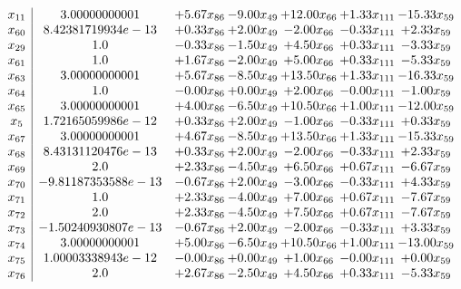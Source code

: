 \documentclass[8pt]{article}
\begin{document}
\[\begin{array}{c| c c@{\hskip 2pt} c@{\hskip 2pt} c@{\hskip 2pt} c@{\hskip 2pt} c@{\hskip 2pt} }
 x_{11}   &  3.00000000001 & +  5.67 x_{86} & -9.00 x_{49} & + 12.00 x_{66} & +  1.33 x_{111} & -15.33 x_{59}\\
 x_{60}   &  8.42381719934e-13 & +  0.33 x_{86} & +  2.00 x_{49} & -2.00 x_{66} & -0.33 x_{111} & +  2.33 x_{59}\\
 x_{29}   &  1.0 & -0.33 x_{86} & -1.50 x_{49} & +  4.50 x_{66} & +  0.33 x_{111} & -3.33 x_{59}\\
 x_{61}   &  1.0 & +  1.67 x_{86} & -2.00 x_{49} & +  5.00 x_{66} & +  0.33 x_{111} & -5.33 x_{59}\\
 x_{63}   &  3.00000000001 & +  5.67 x_{86} & -8.50 x_{49} & + 13.50 x_{66} & +  1.33 x_{111} & -16.33 x_{59}\\
 x_{64}   &  1.0 & -0.00 x_{86} & +  0.00 x_{49} & +  2.00 x_{66} & -0.00 x_{111} & -1.00 x_{59}\\
 x_{65}   &  3.00000000001 & +  4.00 x_{86} & -6.50 x_{49} & + 10.50 x_{66} & +  1.00 x_{111} & -12.00 x_{59}\\
 x_{5}   &  1.72165059986e-12 & +  0.33 x_{86} & +  2.00 x_{49} & -1.00 x_{66} & -0.33 x_{111} & +  0.33 x_{59}\\
 x_{67}   &  3.00000000001 & +  4.67 x_{86} & -8.50 x_{49} & + 13.50 x_{66} & +  1.33 x_{111} & -15.33 x_{59}\\
 x_{68}   &  8.43131120476e-13 & +  0.33 x_{86} & +  2.00 x_{49} & -2.00 x_{66} & -0.33 x_{111} & +  2.33 x_{59}\\
 x_{69}   &  2.0 & +  2.33 x_{86} & -4.50 x_{49} & +  6.50 x_{66} & +  0.67 x_{111} & -6.67 x_{59}\\
 x_{70}   &  -9.81187353588e-13 & -0.67 x_{86} & +  2.00 x_{49} & -3.00 x_{66} & -0.33 x_{111} & +  4.33 x_{59}\\
 x_{71}   &  1.0 & +  2.33 x_{86} & -4.00 x_{49} & +  7.00 x_{66} & +  0.67 x_{111} & -7.67 x_{59}\\
 x_{72}   &  2.0 & +  2.33 x_{86} & -4.50 x_{49} & +  7.50 x_{66} & +  0.67 x_{111} & -7.67 x_{59}\\
 x_{73}   &  -1.50240930807e-13 & -0.67 x_{86} & +  2.00 x_{49} & -2.00 x_{66} & -0.33 x_{111} & +  3.33 x_{59}\\
 x_{74}   &  3.00000000001 & +  5.00 x_{86} & -6.50 x_{49} & + 10.50 x_{66} & +  1.00 x_{111} & -13.00 x_{59}\\
 x_{75}   &  1.00003338943e-12 & -0.00 x_{86} & +  0.00 x_{49} & +  1.00 x_{66} & -0.00 x_{111} & +  0.00 x_{59}\\
 x_{76}   &  2.0 & +  2.67 x_{86} & -2.50 x_{49} & +  4.50 x_{66} & +  0.33 x_{111} & -5.33 x_{59}\\

\end{array}\]
\end{document}

